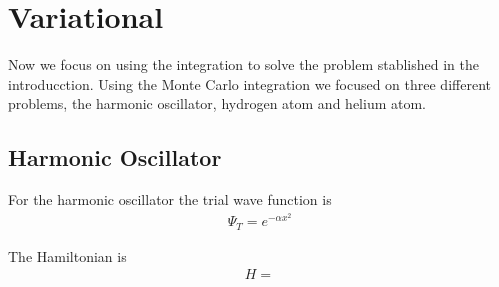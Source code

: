 \section{Variational}
 Now we focus on using the integration to solve the problem stablished in the introducction.
 Using the Monte Carlo integration we focused on three different problems, the harmonic oscillator,
 hydrogen atom and helium atom.

\subsection{Harmonic Oscillator}
  For the harmonic oscillator the trial wave function is
  \begin{align}
    \Psi_T = e^{-\alpha x^2}
  \end{align}

  The Hamiltonian is
  \begin{align}
    H =
  \end{align}
